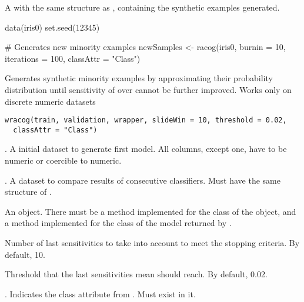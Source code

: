 %
\begin{Value}
A  with the same structure as ,
containing the synthetic examples generated.
\end{Value}
%
\begin{Examples}
\begin{ExampleCode}
data(iris0)
set.seed(12345)

# Generates new minority examples
newSamples <- racog(iris0, burnin = 10, iterations = 100, classAttr = "Class")

\end{ExampleCode}
\end{Examples}
%
\begin{Description}\relax
Generates synthetic minority examples by approximating their probability
distribution until sensitivity of  over 
cannot be further improved. Works only on discrete numeric datasets
\end{Description}
%
\begin{Usage}
\begin{verbatim}
wracog(train, validation, wrapper, slideWin = 10, threshold = 0.02,
  classAttr = "Class")
\end{verbatim}
\end{Usage}
%
\begin{Arguments}
\begin{ldescription}
\item[\code{train}] . A initial dataset to generate first model.
All columns, except  one, have to be numeric or coercible
to numeric.

\item[\code{validation}] . A dataset to compare results of
consecutive classifiers. Must have the same structure of .

\item[\code{wrapper}] An  object. There must be a method
 implemented for the class of the object, and a
 method implemented for the class of the model
returned by .

\item[\code{slideWin}] Number of last sensitivities to take into account to meet the
stopping criteria. By default, 10.

\item[\code{threshold}] Threshold that the last  sensitivities mean
should reach. By default, 0.02.

\item[\code{classAttr}] . Indicates the class attribute from
. Must exist in it.
\end{ldescription}
\end{Arguments}
